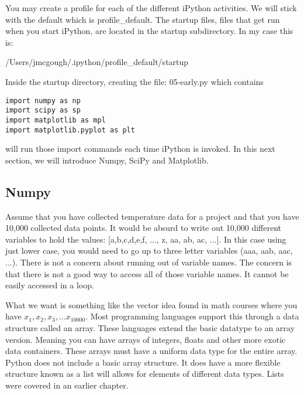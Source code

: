 \begin{Shaded}
\begin{Highlighting}[]
\NormalTok{$ }

\NormalTok{$ }
\end{Highlighting}
\end{Shaded}

You may create a profile for each of the different iPython activities.
We will stick with the default which is profile\_default. The startup
files, files that get run when you start iPython, are located in the
startup subdirectory. In my case this is:

/Users/jmcgough/.ipython/profile\_default/startup

Inside the startup directory, creating the file: 05-early.py which
contains

\begin{verbatim}
import numpy as np
import scipy as sp
import matplotlib as mpl
import matplotlib.pyplot as plt
\end{verbatim}

will run those import commands each time iPython is invoked. In this
next section, we will introduce Numpy, SciPy and Matplotlib.

\hypertarget{numpy}{%
\subsection{Numpy}\label{numpy}}

Assume that you have collected temperature data for a project and that
you have 10,000 collected data points. It would be absurd to write out
10,000 different variables to hold the values: {[}a,b,c,d,e,f, ..., z,
aa, ab, ac, ...{]}. In this case using just lower case, you would need
to go up to three letter variables (aaa, aab, aac, ...). There is not a
concern about running out of variable names. The concern is that there
is not a good way to access all of those variable names. It cannot be
easily accessed in a loop.

What we want is something like the vector idea found in math courses
where you have \(x_1, x_2, x_3, ... x_{10000}\). Most programming
languages support this through a data structure called an array. These
languages extend the basic datatype to an array version. Meaning you can
have arrays of integers, floats and other more exotic data containers.
These arrays must have a uniform data type for the entire array. Python
does not include a basic array structure. It does have a more flexible
structure known as a list will allows for elements of different data
types. Lists were covered in an earlier chapter.

